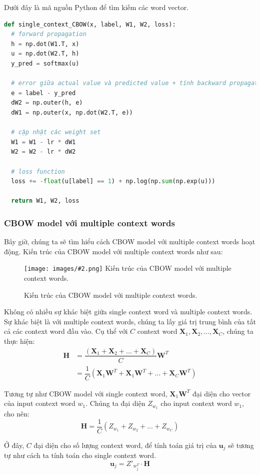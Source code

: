 \documentclass[12pt]{article}
\newcommand{\includeImage}[3]{
\begin{figure}[H]
  \centering
  \texttt{[image: images/\#2.png]}
  \def\temp{#3}\ifx\temp\empty\else\caption{#3}\fi
\end{figure}}
\begin{document}
\indent Dưới đây là mã nguồn Python để tìm kiếm các word vector.
\begin{lstlisting}[language=python]
def single_context_CBOW(x, label, W1, W2, loss):
  # forward propagation
  h = np.dot(W1.T, x)
  u = np.dot(W2.T, h)
  y_pred = softmax(u)

  # error giữa actual value và predicted value + tính backward propagation
  e = label - y_pred
  dW2 = np.outer(h, e)
  dW1 = np.outer(x, np.dot(W2.T, e))

  # cập nhật các weight set
  W1 = W1 - lr * dW1
  W2 = W2 - lr * dW2

  # loss function
  loss += -float(u[label] == 1) + np.log(np.sum(np.exp(u)))

  return W1, W2, loss
\end{lstlisting}

\subsubsection{CBOW model với multiple context words}
Bây giờ, chúng ta sẽ tìm hiểu cách CBOW model với multiple context words hoạt động. Kiến trúc của CBOW model với multiple context words như sau:

\includeImage{1}{08}{Kiến trúc của CBOW model với multiple context words.}

\indent Không có nhiều sự khác biệt giữa single context word và multiple context words. Sự khác biệt là với multiple context words, chúng ta lấy giá trị trung bình của tất cả các context word đầu vào. Cụ thể với $C$ context word $\boldsymbol{X}_1, \boldsymbol{X}_2, \hdots, \boldsymbol{X}_C$, chúng ta thực hiện:
$$\begin{aligned}\boldsymbol{H} &= \dfrac{(\boldsymbol{X}_1 + \boldsymbol{X}_2 + \hdots + \boldsymbol{X}_C)}{C} \boldsymbol{W}^T \\ &= \dfrac{1}{C}(\boldsymbol{X}_1 \boldsymbol{W}^T + \boldsymbol{X}_1 \boldsymbol{W}^T + \hdots + \boldsymbol{X}_C \boldsymbol{W}^T) \end{aligned}$$

\indent Tương tự như CBOW model với single context word, $\boldsymbol{X}_1 \boldsymbol{W}^T$ đại diện cho vector của input context word $w_1$. Chúng ta đại diện $Z_{w_1}$ cho input context word $w_1$, cho nên:
\begin{equation}\boldsymbol{H} = \dfrac{1}{C} (Z_{w_1} + Z_{w_2} + \hdots + Z_{w_C})\end{equation}

\indent Ở đây, $C$ đại diện cho số lượng context word, để tính toán giá trị của $\boldsymbol{u}_j$ sẽ tương tự như cách ta tính toán cho single context word.
\begin{equation}
  \boldsymbol{u}_j = Z'_{w_j^T} \cdot \boldsymbol{H}
\end{equation}
\end{document}
